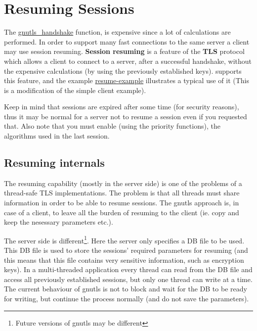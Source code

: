 \section{Resuming Sessions}
\par
The 
\hyperref{gnutls\_handshake()}{gnutls\_handshake() (see Section }{ for more information)}{gnutls_handshake}
 function, is expensive since a lot of calculations are performed. In order to support many fast connections to
the same server a client may use session resuming. {\bf Session resuming} is a
feature of the {\bf TLS} protocol which allows a client to connect to a server,
after a successful handshake, without the expensive calculations (by using the previously
established keys). \gnutls supports this feature, and the
example \hyperref{resume client}{resume client (see Section }{ for more
information)}{resume-example} illustrates a typical use of it (This is a modification of the simple client example).
\par
Keep in mind that sessions are expired after some time (for security reasons), thus
it may be normal for a server not to resume a session even if you requested that.
Also note that you must enable (using the priority functions), the
algorithms used in the last session.

\subsection{Resuming internals}
The resuming capability (mostly in the server side) is one of the problems of a thread-safe TLS
implementations. The problem is that all threads must share information in
order to be able to resume sessions. The gnutls approach is, in case of a
client, to leave all the burden of resuming to the client (ie. copy and keep the
nesessary parameters etc.).
\par
The server side is different\footnote{Future versions of gnutls may be
different}. 
Here the server only specifies a DB file to be
used. This DB file is used to store the sessions' required parameters for
resuming (and this means that this file contains very sensitive information,
such as encryption keys). In a multi-threaded application every thread can
read from the DB file and access all previously established sessions, but
only one thread can write at a time. The current behaviour of gnutls is
not to block and wait for the DB to be ready for writing, but continue the
process normally (and do not save the parameters).  
